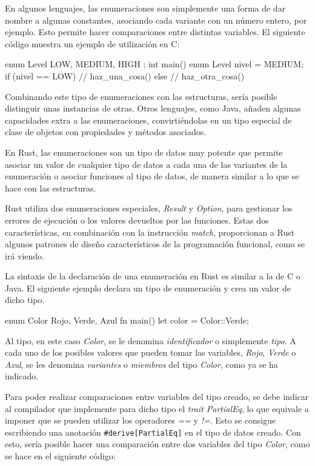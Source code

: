 En algunos lenguajes, las enumeraciones son simplemente una forma de dar nombre a algunas constantes, asociando cada variante con un número entero, por ejemplo. Esto permite hacer comparaciones entre distintas variables. El siguiente código muestra un ejemplo de utilización en C:

\vspace{0.7em}
\begin{Codigo}
enum Level {
   LOW,
   MEDIUM,
   HIGH
};
int main() {
   enum Level nivel = MEDIUM;
   if (nivel == LOW) {
      // haz_una_cosa()
   } else {
      // haz_otra_cosa()
   }  
}
\end{Codigo}

Combinando este tipo de enumeraciones con las estructuras, sería posible distinguir unas instancias de otras. Otros lenguajes, como Java, añaden algunas capacidades extra a las enumeraciones, convirtiéndolas en un tipo especial de clase de objetos con propiedades y métodos asociados. 

En Rust, las enumeraciones son un tipo de datos muy potente que permite asociar un valor de cualquier tipo de datos a cada una de las variantes de la enumeración o asociar funciones al tipo de datos, de manera similar a lo que se hace con las estructuras. 

Rust utiliza dos enumeraciones especiales, \textit{Result} y \textit{Option}, para gestionar los errores de ejecución o los valores devueltos por las funciones. Estas dos características, en combinación con la instrucción \textit{match}, proporcionan a Rust algunos patrones de diseño característicos de la programación funcional, como se irá viendo. 

La sintaxis de la declaración de una enumeración en Rust es similar a la de C o Java. El siguiente ejemplo declara un tipo de enumeración y crea un valor de dicho tipo.

\vspace{0.7em}
\begin{Codigo}
enum Color {
   Rojo,
   Verde,
   Azul
}
fn main() {
   let color = Color::Verde;
}
\end{Codigo}

Al tipo, en este caso \textit{Color}, se le denomina \textit{identificador} o simplemente \textit{tipo}. A cada uno de los posibles valores que pueden tomar las variables, \textit{Rojo}, \textit{Verde} o \textit{Azul}, se les denomina \textit{variantes} o \textit{miembros} del tipo \textit{Color}, como ya se ha indicado.

Para poder realizar comparaciones entre variables del tipo creado, se debe indicar al compilador que implemente para dicho tipo el \textit{trait PartialEq}, lo que equivale a imponer que se pueden utilizar los operadores \textit{==} y \textit{!=}. Esto se consigue escribiendo una anotación \texttt{\#derive[PartialEq]} en el tipo de datos creado. Con esto, sería posible hacer una comparación entre dos variables del tipo \textit{Color}, como se hace en el siguiente código:

